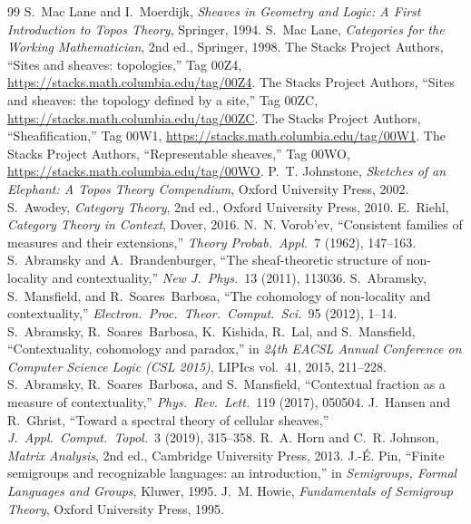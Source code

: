 \begin{thebibliography}{99}
 S.~Mac Lane and I.~Moerdijk, \emph{Sheaves in Geometry and Logic: A First Introduction to Topos Theory}, Springer, 1994.
 S.~Mac Lane, \emph{Categories for the Working Mathematician}, 2nd ed., Springer, 1998.
 The Stacks Project Authors, ``Sites and sheaves: topologies,'' Tag 00Z4, \url{https://stacks.math.columbia.edu/tag/00Z4}.
 The Stacks Project Authors, ``Sites and sheaves: the topology defined by a site,'' Tag 00ZC, \url{https://stacks.math.columbia.edu/tag/00ZC}.
 The Stacks Project Authors, ``Sheafification,'' Tag 00W1, \url{https://stacks.math.columbia.edu/tag/00W1}.
 The Stacks Project Authors, ``Representable sheaves,'' Tag 00WO, \url{https://stacks.math.columbia.edu/tag/00WO}.
 P.~T. Johnstone, \emph{Sketches of an Elephant: A Topos Theory Compendium}, Oxford University Press, 2002.
 S.~Awodey, \emph{Category Theory}, 2nd ed., Oxford University Press, 2010.
 E.~Riehl, \emph{Category Theory in Context}, Dover, 2016.
 N.~N. Vorob'ev, ``Consistent families of measures and their extensions,'' \emph{Theory Probab.\ Appl.}\ 7 (1962), 147--163.
 S.~Abramsky and A.~Brandenburger, ``The sheaf-theoretic structure of non-locality and contextuality,'' \emph{New J.\ Phys.}\ 13 (2011), 113036.
 S.~Abramsky, S.~Mansfield, and R.~Soares~Barbosa, ``The cohomology of non-locality and contextuality,'' \emph{Electron.\ Proc.\ Theor.\ Comput.\ Sci.}\ 95 (2012), 1--14.
 S.~Abramsky, R.~Soares~Barbosa, K.~Kishida, R.~Lal, and S.~Mansfield, ``Contextuality, cohomology and paradox,'' in \emph{24th EACSL Annual Conference on Computer Science Logic (CSL 2015)}, LIPIcs vol.~41, 2015, 211--228.
 S.~Abramsky, R.~Soares~Barbosa, and S.~Mansfield, ``Contextual fraction as a measure of contextuality,'' \emph{Phys.\ Rev.\ Lett.}\ 119 (2017), 050504.
 J.~Hansen and R.~Ghrist, ``Toward a spectral theory of cellular sheaves,'' \emph{J.\ Appl.\ Comput.\ Topol.}\ 3 (2019), 315--358.
 R.~A. Horn and C.~R. Johnson, \emph{Matrix Analysis}, 2nd ed., Cambridge University Press, 2013.
 J.-\'E. Pin, ``Finite semigroups and recognizable languages: an introduction,'' in \emph{Semigroups, Formal Languages and Groups}, Kluwer, 1995.
 J.~M. Howie, \emph{Fundamentals of Semigroup Theory}, Oxford University Press, 1995.

\end{thebibliography}
